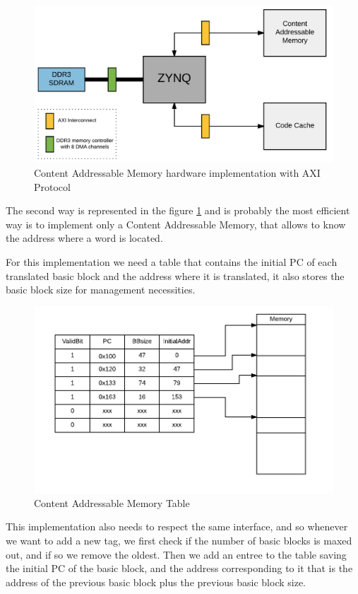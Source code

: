 \begin{figure} [H]
	\centering
	\includegraphics[scale = 0.2]{Images/DesignHw2.png}
	\caption{Content Addressable Memory hardware implementation with AXI Protocol}
	\label{fig:CAM_Hw}
\end{figure}

The second way is represented in the figure \ref{fig:CAM_Hw} and is probably the most efficient way is to implement only a Content Addressable Memory, that allows to know the address where a word is located. 

For this implementation we need a table that contains the initial PC of each translated basic block and the address where it is translated, it also stores the basic block size for management necessities.

\begin{figure} [H]
	\centering
	\includegraphics[scale = 0.35]{Images/CAM.png}
	\caption{Content Addressable Memory Table}
	\label{fig:CAM_table}
\end{figure}

This implementation also needs to respect the same interface, and so whenever we want to add a new tag, we first check if the number of basic blocks is maxed out, and if so we remove the oldest. Then we add an entree to the table saving the initial PC of the basic block, and the address corresponding to it that is the address of the previous basic block plus the previous basic block size.

